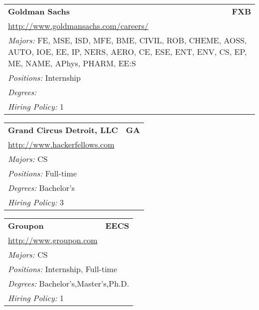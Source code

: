 \documentclass[twoside]{article}
\begin{document}
\begin{center}
\begin{multicols}{3}
\begin{FlushLeft}
\begin{minipage}{\columnwidth}\begin{tabularx}{.95\columnwidth}{Xr}
                 {\Large\bf Goldman Sachs} & {\Large\bf FXB}\\
    \multicolumn{2}{p{.95\columnwidth}}{\url{http://www.goldmansachs.com/careers/}}\\
    \multicolumn{2}{p{.95\columnwidth}}{\emph{Majors:} FE, MSE, ISD, MFE, BME, CIVIL, ROB, CHEME, AOSS, AUTO, IOE, EE, IP, NERS, AERO, CE, ESE, ENT, ENV, CS, EP, ME, NAME, APhys, PHARM, EE:S}\\
    \multicolumn{2}{p{.95\columnwidth}}{\emph{Positions:} Internship}\\
    \multicolumn{2}{p{.95\columnwidth}}{\emph{Degrees:} }\\
    \multicolumn{2}{p{.95\columnwidth}}{\emph{Hiring Policy:} 1}\\
    \end{tabularx}
    
\end{minipage}
 
\begin{minipage}{\columnwidth}\begin{tabularx}{.95\columnwidth}{Xr}
                 {\Large\bf Grand Circus Detroit, LLC} & {\Large\bf GA}\\
    \multicolumn{2}{p{.95\columnwidth}}{\url{http://www.hackerfellows.com}}\\
    \multicolumn{2}{p{.95\columnwidth}}{\emph{Majors:} CS}\\
    \multicolumn{2}{p{.95\columnwidth}}{\emph{Positions:} Full-time}\\
    \multicolumn{2}{p{.95\columnwidth}}{\emph{Degrees:} Bachelor's}\\
    \multicolumn{2}{p{.95\columnwidth}}{\emph{Hiring Policy:} 3}\\
    \end{tabularx}
    
\end{minipage}
 
\begin{minipage}{\columnwidth}\begin{tabularx}{.95\columnwidth}{Xr}
                 {\Large\bf Groupon} & {\Large\bf EECS}\\
    \multicolumn{2}{p{.95\columnwidth}}{\url{http://www.groupon.com}}\\
    \multicolumn{2}{p{.95\columnwidth}}{\emph{Majors:} CS}\\
    \multicolumn{2}{p{.95\columnwidth}}{\emph{Positions:} Internship, Full-time}\\
    \multicolumn{2}{p{.95\columnwidth}}{\emph{Degrees:} Bachelor's,Master's,Ph.D.}\\
    \multicolumn{2}{p{.95\columnwidth}}{\emph{Hiring Policy:} 1}\\
    \end{tabularx}
    

\end{minipage}
\end{FlushLeft}
\end{multicols}
\end{center}
\end{document}

